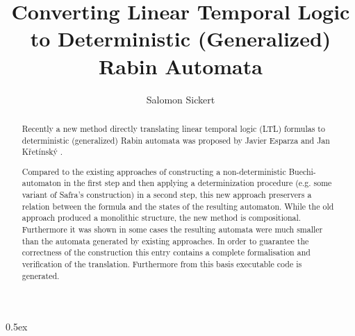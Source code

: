 \documentclass[11pt,a4paper]{article}
\begin{document}
\title{Converting Linear Temporal Logic to Deterministic (Generalized) Rabin Automata}
\author{Salomon Sickert}
\maketitle

\begin{abstract}
Recently a new method directly translating linear temporal logic (LTL) formulas to deterministic (generalized) Rabin automata was proposed by Javier Esparza and Jan Křetínský \cite{DBLP:conf/cav/EsparzaK14}. 

Compared to the existing approaches of constructing a non-deterministic Buechi-automaton in the first step and then applying a determinization procedure (e.g. some variant of Safra's construction) in a second step, this new approach preservers a relation between the formula and the states of the resulting automaton. While the old approach produced a monolithic structure, the new method is compositional. Furthermore it was shown in some cases the resulting automata were much smaller than the automata generated by existing approaches. In order to guarantee the correctness of the construction this entry contains a complete formalisation and verification of the translation. Furthermore from this basis executable code is generated.
\end{abstract}

\tableofcontents

\parindent 0pt\parskip 0.5ex





\end{document}
